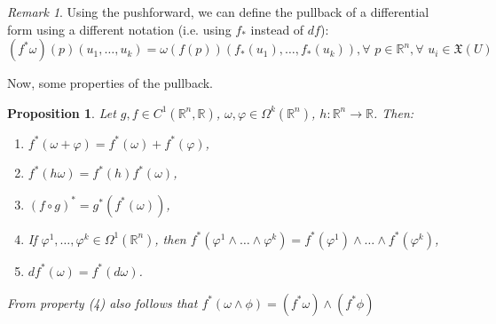 \documentclass[a4paper,11pt,titlepage, article, oneside]{memoir}
\numberwithin{equation}{section}
\newtheorem{proposition}[theorem]{Proposition}
\theoremstyle{definition}
\theoremstyle{remark}
\newtheorem{remark}[theorem]{Remark}
\newcommand{\rfield}{\mathbb{R}}
\begin{document}
\begin{remarkbox}\begin{remark}
Using the pushforward, we can define the pullback of a differential form using a different notation (i.e. using $f_*$ instead of $df$):
  \begin{equation}
    (f^* \omega)(p) (u_1, \ldots, u_k) = \omega (f(p)) (f_*(u_1), \ldots, f_*(u_k)), \forall\, \, p \in \rfield^n, \forall \,\, u_i \in \mathfrak{X}(U)
  \end{equation}
\end{remark}\end{remarkbox}

Now, some properties of the pullback.

\begin{proposition} \label{pullbackprop}
  Let $g, f \in C^1(\rfield^n, \rfield)$, $\omega, \varphi \in \Omega^k(\rfield^n)$, $h\colon \rfield^n \rightarrow \rfield$. Then:
  \begin{enumerate}
    \item $f^*(\omega + \varphi) = f^*(\omega) + f^*(\varphi)$,
    \item $f^*(h \omega) = f^*(h)f^*(\omega)$,
    \item $(f \circ g)^* = g^*(f^*(\omega))$,
    \item If $\varphi^1, \ldots, \varphi^k \in \Omega^1(\rfield^n)$, then $f^*(\varphi^1 \wedge \ldots \wedge \varphi^k) = f^*(\varphi^1) \wedge \ldots \wedge f^*(\varphi^k)$,
    \item $df^*(\omega) = f^*(d\omega)$.
  \end{enumerate}
  From property (4) also follows that $f^*(\omega \wedge \phi) = (f^*\omega) \wedge (f^* \phi)$
\end{proposition}
\end{document}
